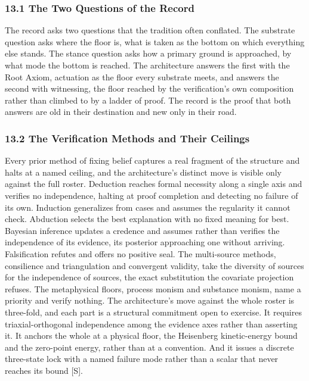 \documentclass[10pt,twocolumn]{article}
\begin{document}
\hypertarget{the-two-questions-of-the-record}{%
\subsubsection{13.1 The Two Questions of the
Record}\label{the-two-questions-of-the-record}}

The record asks two questions that the tradition often conflated. The
substrate question asks where the floor is, what is taken as the bottom
on which everything else stands. The stance question asks how a primary
ground is approached, by what mode the bottom is reached. The
architecture answers the first with the Root Axiom, actuation as the
floor every substrate meets, and answers the second with witnessing, the
floor reached by the verification's own composition rather than climbed
to by a ladder of proof. The record is the proof that both answers are
old in their destination and new only in their road.

\hypertarget{the-verification-methods-and-their-ceilings}{%
\subsubsection{13.2 The Verification Methods and Their
Ceilings}\label{the-verification-methods-and-their-ceilings}}

Every prior method of fixing belief captures a real fragment of the
structure and halts at a named ceiling, and the architecture's distinct
move is visible only against the full roster. Deduction reaches formal
necessity along a single axis and verifies no independence, halting at
proof completion and detecting no failure of its own. Induction
generalizes from cases and assumes the regularity it cannot check.
Abduction selects the best explanation with no fixed meaning for best.
Bayesian inference updates a credence and assumes rather than verifies
the independence of its evidence, its posterior approaching one without
arriving. Falsification refutes and offers no positive seal. The
multi-source methods, consilience and triangulation and convergent
validity, take the diversity of sources for the independence of sources,
the exact substitution the covariate projection refuses. The
metaphysical floors, process monism and substance monism, name a
priority and verify nothing. The architecture's move against the whole
roster is three-fold, and each part is a structural commitment open to
exercise. It requires triaxial-orthogonal independence among the
evidence axes rather than asserting it. It anchors the whole at a
physical floor, the Heisenberg kinetic-energy bound and the zero-point
energy, rather than at a convention. And it issues a discrete
three-state lock with a named failure mode rather than a scalar that
never reaches its bound {[}S{]}.
\end{document}
